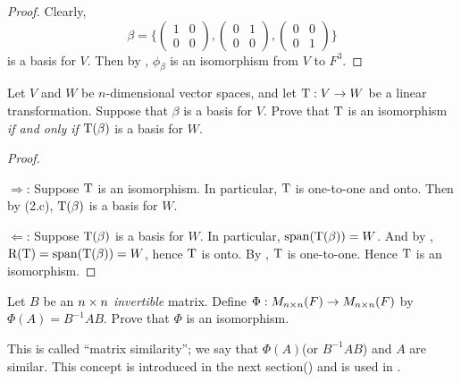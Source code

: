 \begin{proof}
Clearly,
\[\beta = \bigg\{
    \begin{pmatrix} 1 & 0 \\ 0 & 0 \end{pmatrix},
    \begin{pmatrix} 0 & 1 \\ 0 & 0 \end{pmatrix},
    \begin{pmatrix} 0 & 0 \\ 0 & 1 \end{pmatrix}
\bigg\}\]
is a basis for \(V\).
Then by , \(\phi_{\beta}\) is an isomorphism from \(V\) to \(F^3\).
\end{proof}

\begin{exercise} \label{exercise 2.4.15}
Let \(V\) and \(W\) be \(n\)-dimensional vector spaces, and let \(\mathrm{T} : V \to W\) be a linear transformation.
Suppose that \(\beta\) is a basis for \(V\).
Prove that \(\mathrm{T}\) is an isomorphism \emph{if and only if} \(\mathrm{T}(\beta)\) is a basis for \(W\).
\end{exercise}

\begin{proof} \ 

\(\Longrightarrow\): Suppose \(\mathrm{T}\) is an isomorphism.
In particular, \(\mathrm{T}\) is one-to-one and onto.
Then by (2.c), \(\mathrm{T}(\beta)\) is a basis for \(W\).

\(\Longleftarrow\): Suppose \(\mathrm{T}(\beta)\) is a basis for \(W\).
In particular, \(\operatorname{span}(\mathrm{T}(\beta)) = W\).
And by , \(\mathrm{R(T)} = \operatorname{span}(\mathrm{T}(\beta)) = W\), hence \(\mathrm{T}\) is onto.
By , \(\mathrm{T}\) is one-to-one.
Hence \(\mathrm{T}\) is an isomorphism.
\end{proof}

\begin{exercise} \label{exercise 2.4.16}
Let \(B\) be an \(n \times n\) \emph{invertible} matrix.
Define \(\Phi : M_{n \times n}(F) \to M_{n \times n}(F)\) by \(\Phi(A) = B^{-1}AB\).
Prove that \(\Phi\) is an isomorphism.
\end{exercise}

\begin{note}
This is called ``matrix similarity''; we say that \(\Phi(A)\)(or \(B^{-1}AB\)) and \(A\) are similar.
This concept is introduced in the next section() and is used in .
\end{note}

